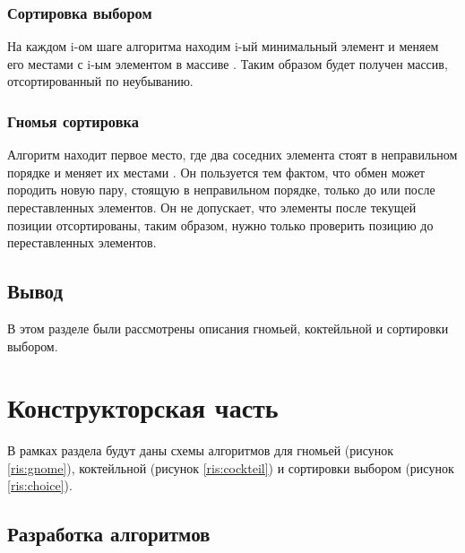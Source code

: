 \documentclass[a4paper,12pt]{report}
\begin{document}
    \subsection{Сортировка выбором}

    		На каждом i-ом шаге алгоритма находим i-ый минимальный элемент и меняем его местами с i-ым элементом в массиве \cite{Knut_choice}. 
    		Таким образом будет получен массив, отсортированный по неубыванию.
    
    \subsection{Гномья сортировка}

   			Алгоритм находит первое место, где два соседних элемента стоят в неправильном порядке и меняет их местами \cite{Axo_gnome}. 
   			Он пользуется тем фактом, что обмен может породить новую пару, стоящую в неправильном порядке, только до или после переставленных элементов. 
   			Он не допускает, что элементы после текущей позиции отсортированы, таким образом, нужно только проверить позицию до переставленных элементов.

	\section{Вывод}

   			В этом разделе были рассмотрены описания гномьей, коктейльной и сортировки выбором.

    \newpage

    \chapter{Конструкторская часть}
        \label{sec:construct_part}

        	В рамках раздела будут даны схемы алгоритмов для гномьей (рисунок \ref{ris:gnome}), коктейльной (рисунок \ref{ris:cockteil}) и сортировки выбором (рисунок \ref{ris:choice}).

	\section{Разработка алгоритмов}
\end{document}
